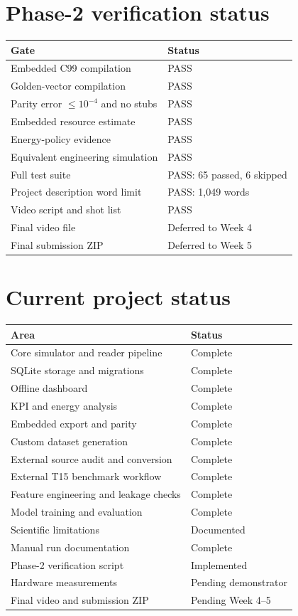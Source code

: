 \documentclass[11pt,a4paper]{article}
\begin{document}
\section{Phase-2 verification status}
\begin{center}
\begin{tabular}{ll}
\toprule
\textbf{Gate} & \textbf{Status} \\
\midrule
Embedded C99 compilation & PASS \\
Golden-vector compilation & PASS \\
Parity error $\leq 10^{-4}$ and no stubs & PASS \\
Embedded resource estimate & PASS \\
Energy-policy evidence & PASS \\
Equivalent engineering simulation & PASS \\
Full test suite & PASS: 65 passed, 6 skipped \\
Project description word limit & PASS: 1{,}049 words \\
Video script and shot list & PASS \\
Final video file & Deferred to Week 4 \\
Final submission ZIP & Deferred to Week 5 \\
\bottomrule
\end{tabular}
\end{center}

\section{Current project status}
\begin{center}
\begin{tabular}{ll}
\toprule
\textbf{Area} & \textbf{Status} \\
\midrule
Core simulator and reader pipeline & Complete \\
SQLite storage and migrations & Complete \\
Offline dashboard & Complete \\
KPI and energy analysis & Complete \\
Embedded export and parity & Complete \\
Custom dataset generation & Complete \\
External source audit and conversion & Complete \\
External T15 benchmark workflow & Complete \\
Feature engineering and leakage checks & Complete \\
Model training and evaluation & Complete \\
Scientific limitations & Documented \\
Manual run documentation & Complete \\
Phase-2 verification script & Implemented \\
Hardware measurements & Pending demonstrator \\
Final video and submission ZIP & Pending Week 4--5 \\
\bottomrule
\end{tabular}
\end{center}
\end{document}

